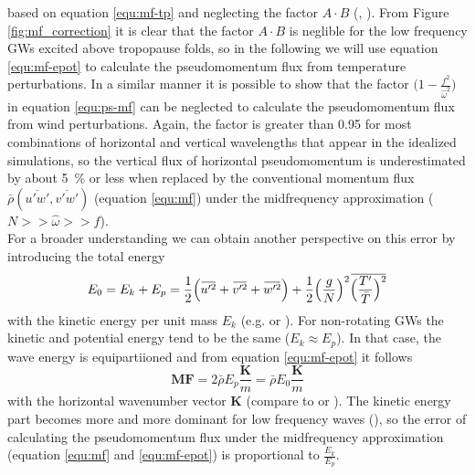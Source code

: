 based on equation \ref{equ:mf-tp} and neglecting the factor $A \cdot B$ (\cite[]{ern_gracile_2018}, \cite*[]{ern_intermittency_2022}). From Figure \ref{fig:mf_correction} it is clear that the factor $A \cdot B$ is neglible for the low frequency GWs excited above tropopause folds, so in the following  we will use equation \ref{equ:mf-epot} to calculate the pseudomomentum flux from temperature perturbations. In a similar manner it is possible to show that the factor $\bigl(1-\frac{f^2}{\hat{\omega}^2}\bigr)$ in equation \ref{equ:ps-mf} can be neglected to calculate the pseudomomentum flux from wind perturbations. Again, the factor is greater than 0.95 for most combinations of horizontal and vertical wavelengths that appear in the idealized simulations, so the vertical flux of horizontal pseudomomentum is underestimated by about \SI{5}{\percent} or less when replaced by the conventional momentum flux $\bar{\rho}(\overbar{u'w'},\overbar{v'w'})$ (equation \ref{equ:mf}) under the midfrequency approximation ($N >> \hat{\omega} >> f$). \\
For a broader understanding we can obtain another perspective on this error by introducing the total energy
\begin{equation}
    E_0 = E_k + E_p = \frac{1}{2} \Bigl(\overbar{u'^2} + \overbar{v'^2} + \overbar{w'^2}\Bigr) + \frac{1}{2} \Bigl(\frac{g}{N}\Bigr)^2 \overbar{\Bigl(\frac{T'}{\bar{T}}\Bigr)^2}
    \label{equ:etot}
\end{equation}
with the kinetic energy per unit mass $E_k$ (e.g. \cite[]{gill_atmosphere-ocean_1982} or \cite[]{tsuda_global_2000}). For non-rotating GWs the kinetic and potential energy tend to be the same ($ E_k \approx E_p$). In that case, the wave energy is equipartiioned and from equation \ref{equ:mf-epot} it follows
\begin{equation}
    \mathbf{MF} = 2 \bar{\rho} E_p \frac{\mathbf{K}}{m} = \bar{\rho} E_{0} \frac{\mathbf{K}}{m}
    \label{equ:mf-etot}
\end{equation}
with the horizontal wavenumber vector $\mathbf{K}$ (compare to \cite[]{andrews_wave-action_1978} or \cite[]{fritts_gravity_2003}). The kinetic energy part becomes more and more dominant for low frequency waves (\cite[]{gill_atmosphere-ocean_1982}), so the error of calculating the pseudomomentum flux under the midfrequency approximation (equation \ref{equ:mf} and \ref{equ:mf-epot}) is proportional to $\frac{E_k}{E_p}$.  

